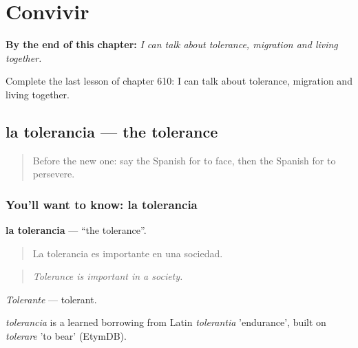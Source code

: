 
\chapter{Convivir}
\label{ch:es-convivir}

\begin{chapteropening}
\textbf{By the end of this chapter:} \emph{I can talk about tolerance, migration and living together.}

Complete the last lesson of chapter 610: I can talk about tolerance, migration and living together.
\end{chapteropening}

\section[la tolerancia]{la tolerancia — the tolerance}

\label{lesson:ES-C610-tolerancia}



\begin{quote}
Before the new one: say the Spanish for to face, then the Spanish for to persevere.
\end{quote}

\subsection*{You'll want to know: la tolerancia}
\textbf{la tolerancia} — \textquotedblleft{}the tolerance\textquotedblright{}.

\begin{quote}
La tolerancia es importante en una sociedad.
\end{quote}

\begin{quote}
\emph{Tolerance is important in a society.}
\end{quote}

\emph{Tolerante} — tolerant.

\begin{cousinweb}
\emph{tolerancia} is a learned borrowing from Latin \emph{tolerantia} 'endurance', built on \emph{tolerare} 'to bear' (EtymDB).
\end{cousinweb}

